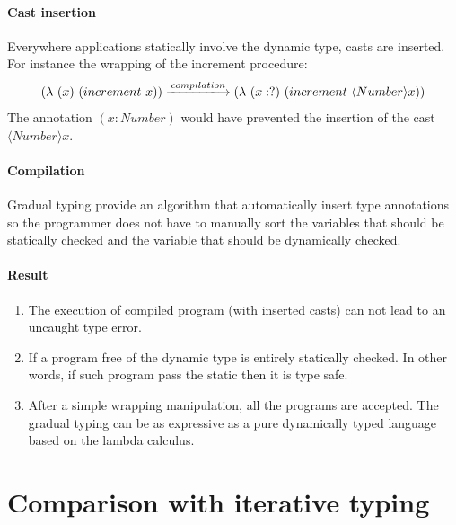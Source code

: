 \documentclass[a4paper]{report}
\begin{document}
\paragraph{Cast insertion} Everywhere applications statically involve the dynamic type, casts are inserted. For instance the wrapping of the increment procedure:
$$(\lambda\ (x)\ (increment\ x))\xlongrightarrow{compilation}(\lambda\ (x:?)\ (increment\ \langle Number\rangle x))$$
The annotation $(x:Number)$ would have prevented the insertion of the cast $\langle Number\rangle x$.

\paragraph{Compilation} Gradual typing provide an algorithm that automatically insert type annotations so the programmer does not have to manually sort the variables that should be statically checked and the variable that should be dynamically checked.

\paragraph{Result}
\begin{enumerate}
\item The execution of compiled program (with inserted casts) can not lead to an uncaught type error.
\item If a program free of the dynamic type is entirely statically checked. In other words, if such program pass the static then it is type safe.
\item After a simple wrapping manipulation, all the programs are accepted. The gradual typing can be as expressive as a pure dynamically typed language based on the lambda calculus.
\end{enumerate}

\section{Comparison with iterative typing}
\end{document}
